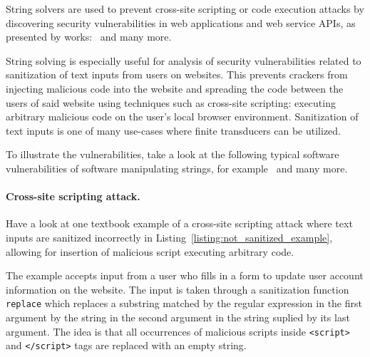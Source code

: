 String solvers are used to prevent cross-site scripting or code execution attacks by discovering security vulnerabilities in web applications and web service APIs, as presented by works:~\cite{String_constraints_with_concatenation_and_transducers_solved_efficiently, Composing_Static_and_Dynamic_Analysis_to_Validate_Sanitization_in_Web_Applications, Satisfiability_Modulo_Theories_Introduction_and_Applications, Simple_linear_string_constraints,Z3-str_a_z3-based_string_solver_for_web_application_analysis,S3_A_Symbolic_String_Solver_for_Vulnerability_Detection_in_Web_Applications} and many more.

String solving is especially useful for analysis of security vulnerabilities related to sanitization of text inputs from users on websites.
This prevents crackers from injecting malicious code into the website and spreading the code between the users of said website using techniques such as cross-site scripting: executing arbitrary malicious code on the user's local browser environment.
Sanitization of text inputs is one of many use-cases where finite transducers can be utilized.

To illustrate the vulnerabilities, take a look at the following typical software vulnerabilities of software manipulating strings, for example~\cite{replace_nfts_model_ModelingRegularReplacementForStringConstraintSolving_DBLP:conf/nfm/FuL10,kern14} and many more.

\paragraph{Cross-site scripting attack.}
Have a look at one textbook example of a cross-site scripting attack where text inputs are sanitized incorrectly in Listing~\ref{listing:not_sanitized_example}, allowing for insertion of malicious script executing arbitrary code.

The example accepts input from a user who fills in a form to update user account information on the website.
The input is taken through a sanitization function \texttt{replace} which replaces a substring matched by the regular expression in the first argument by the string in the second argument in the string suplied by its last argument.
The idea is that all occurrences of malicious scripts inside \texttt{<script>} and \texttt{</script>} tags are replaced with an empty string.

